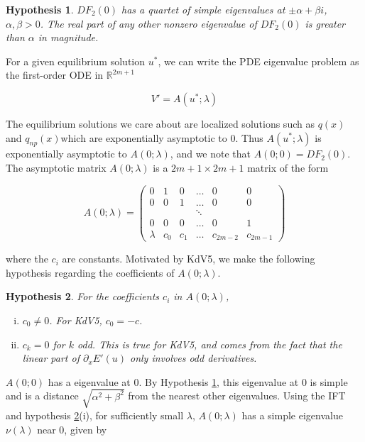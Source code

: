 \documentclass[12pt]{article}
\def\R{{\mathbb R}}
\newtheorem{hypothesis}{Hypothesis}
\begin{document}
\begin{hypothesis}\label{quartet}
$D F_2(0)$ has a quartet of simple eigenvalues at $\pm \alpha + \beta i$, $\alpha, \beta > 0$. The real part of any other nonzero eigenvalue of $D F_2(0)$ is greater than $\alpha$ in magnitude.
\end{hypothesis}

For a given equilibrium solution $u^*$, we can write the PDE eigenvalue problem as the first-order ODE in $\R^{2m+1}$

\begin{equation}
V' = A(u^*; \lambda)
\end{equation}

The equilibrium solutions we care about are localized solutions such as $q(x)$ and $q_{np}(x)$which are exponentially asymptotic to 0. Thus $A(u^*; \lambda)$ is exponentially asymptotic to $A(0; \lambda)$, and we note that $A(0; 0) = D F_2(0)$. The asymptotic matrix $A(0; \lambda)$ is a $2m + 1 \times 2m + 1$ matrix of the form

\begin{equation}
A(0; \lambda) = \begin{pmatrix}
0 & 1 & 0 & \dots & 0 & 0 \\
0 & 0 & 1 & \dots & 0 & 0 \\
& & & \ddots & & \\
0 & 0 & 0 & \dots & 0 & 1 \\
\lambda & c_0 & c_1 & \dots & c_{2m-2} & c_{2m-1}
\end{pmatrix}
\end{equation}

where the $c_i$ are constants. Motivated by KdV5, we make the following hypothesis regarding the coefficients of $A(0; \lambda)$.

\begin{hypothesis}\label{A0coeffs}
For the coefficients $c_i$ in $A(0; \lambda)$,
\begin{enumerate}[(i)]
\item $c_0 \neq 0$. For KdV5, $c_0 = -c$.
\item $c_k = 0$ for $k$ odd. This is true for KdV5, and comes from the fact that the linear part of $\partial_x E'(u)$ only involves odd derivatives. 
\end{enumerate}
\end{hypothesis}

$A(0; 0)$ has a eigenvalue at 0. By Hypothesis \ref{quartet}, this eigenvalue at 0 is simple and is a distance $\sqrt{\alpha^2 + \beta^2}$ from the nearest other eigenvalues. Using the IFT and hypothesis \ref{A0coeffs}(i), for sufficiently small $\lambda$, $A(0; \lambda)$ has a simple eigenvalue $\nu(\lambda)$ near 0, given by
\end{document}
